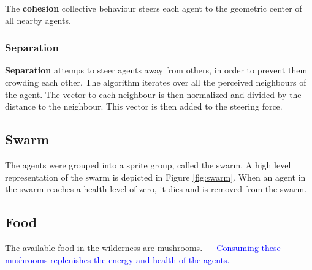 The \textbf{cohesion} collective behaviour steers each agent to the geometric center of all nearby agents.



\subsubsection*{Separation}
\textbf{Separation} attemps to steer agents away from others, in order to prevent them crowding each other.
The algorithm iterates over all the perceived neighbours of the agent.
The vector to each neighbour is then normalized and divided by the distance to the neighbour.
This vector is then added to the steering force. 




\subsection{Swarm} \label{subsection:swarm}
The agents were grouped into a sprite group, called the swarm. 
A high level representation of the swarm is depicted in Figure \ref{fig:swarm}.
When an agent in the swarm reaches a health level of zero, it dies and is removed from the swarm.



\subsection{Food} \label{subsection:food}
The available food in the wilderness are mushrooms.
\textcolor{blue}{---
Consuming these mushrooms replenishes the energy and health of the agents. 
---}



